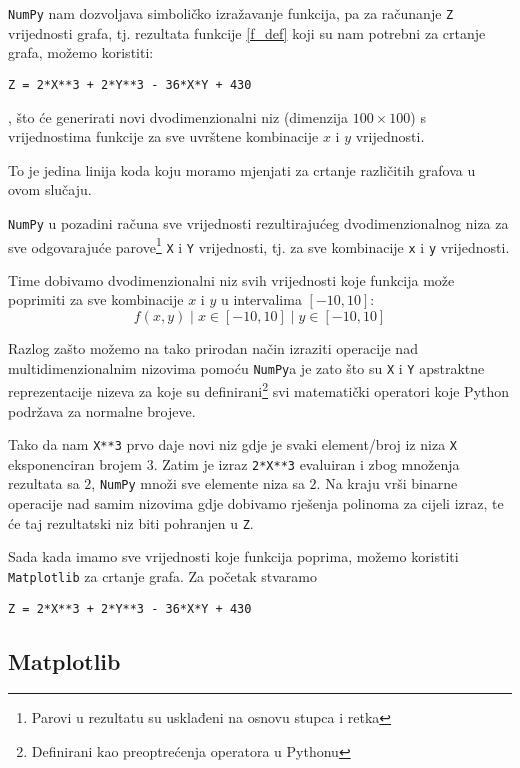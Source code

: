 \newpage
\verb|NumPy| nam dozvoljava simboličko izražavanje funkcija,
pa za računanje \verb|Z| vrijednosti grafa, tj. rezultata funkcije \eqref{f_def} koji su nam
potrebni za crtanje grafa, možemo koristiti:
\begin{verbatim}
Z = 2*X**3 + 2*Y**3 - 36*X*Y + 430
\end{verbatim}
, što će generirati novi dvodimenzionalni niz (dimenzija $100\times100$) s vrijednostima
funkcije  za sve uvrštene kombinacije $x$ i $y$ vrijednosti.\par
To je jedina linija koda koju moramo mjenjati za crtanje različitih grafova u ovom slučaju.\par
\verb|NumPy| u pozadini računa sve vrijednosti rezultirajućeg dvodimenzionalnog niza za sve odgovarajuće
parove\footnote{Parovi u rezultatu su usklađeni na osnovu stupca i retka} \verb|X| i \verb|Y| vrijednosti,
tj. za sve kombinacije \verb|x| i \verb|y| vrijednosti.

Time dobivamo dvodimenzionalni niz svih vrijednosti koje funkcija može poprimiti za sve kombinacije $x$ i $y$ u intervalima $[-10, 10]$:
$$
{{f(x,y) \mid x \in [-10, 10]} \mid y \in [-10, 10]}
$$

Razlog zašto možemo na tako prirodan način izraziti operacije nad multidimenzionalnim nizovima pomoću \verb|NumPy|a je zato što su
\verb|X| i \verb|Y| apstraktne reprezentacije nizeva za koje su definirani\footnote{Definirani kao preoptrećenja operatora u Pythonu} svi matematički operatori koje Python podržava za normalne brojeve.\par
Tako da nam \verb|X**3| prvo daje novi niz gdje je svaki element/broj iz niza \verb|X| eksponenciran brojem $3$.
Zatim je izraz \verb|2*X**3| evaluiran i zbog množenja rezultata sa $2$, \verb|NumPy| množi sve elemente niza sa $2$.
Na kraju vrši binarne operacije nad samim nizovima gdje dobivamo rješenja polinoma za cijeli izraz, te će taj rezultatski niz biti pohranjen u \verb|Z|.

Sada kada imamo sve vrijednosti koje funkcija poprima, možemo koristiti \verb|Matplotlib| za crtanje grafa. Za početak stvaramo 
\begin{verbatim}
Z = 2*X**3 + 2*Y**3 - 36*X*Y + 430
\end{verbatim}

\newpage
\subsection{Matplotlib}

